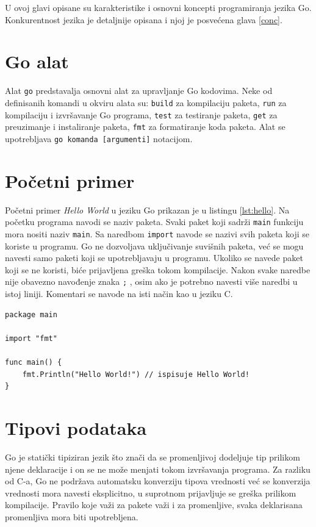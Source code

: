 \documentclass[12pt,oneside]{memoir}
\begin{document}
U ovoj glavi opisane su karakteristike i osnovni koncepti programiranja jezika Go.  Konkurentnost jezika je detaljnije opisana i njoj je posvećena glava \ref{conc}.

\section{Go alat}

Alat \texttt{go} predstavalja osnovni alat za upravljanje Go kodovima. Neke od definisanih komandi u okviru alata su: \texttt{build} za kompilaciju paketa, \texttt{run} za kompilaciju i izvršavanje Go programa, \texttt{test} za testiranje paketa, \texttt{get} za preuzimanje i instaliranje paketa, \texttt{fmt} za formatiranje koda paketa. Alat se upotrebljava \texttt{go komanda [argumenti]} notacijom.

\section{Početni primer}

Početni primer \textit{Hello World} u jeziku Go prikazan je u listingu \ref{lst:hello}. Na početku programa navodi se naziv paketa. Svaki paket koji sadrži \texttt{main} funkciju mora nositi naziv \texttt{main}. Sa naredbom \texttt{import} navode se nazivi svih paketa koji se koriste u programu. Go ne dozvoljava uključivanje suvišnih paketa, već se mogu navesti samo paketi koji se upotrebljavaju u programu. Ukoliko se navede paket koji se ne koristi, biće prijavljena greška tokom kompilacije. Nakon svake naredbe nije obavezno navođenje znaka \texttt{;} , osim ako je potrebno navesti više naredbi u istoj liniji. Komentari se navode na isti način kao u jeziku C.

\begin{center}
\begin{lstlisting}[caption=Program \textit{Hello World} u jeziku Go,label={lst:hello},  backgroundcolor=\color{background}]
package main

import "fmt"

func main() {
	fmt.Println("Hello World!") // ispisuje Hello World!
}
\end{lstlisting}
\end{center}

\section{Tipovi podataka}

Go je statički tipiziran jezik što znači da se promenljivoj dodeljuje tip prilikom njene deklaracije i on se ne može menjati tokom izvršavanja programa. Za razliku od C-a, Go ne podržava automatsku konverziju tipova vrednosti već se konverzija vrednosti mora navesti eksplicitno, u suprotnom prijavljuje se greška prilikom kompilacije. Pravilo koje važi za pakete važi i za promenljive, svaka deklarisana promenljiva mora biti upotrebljena.
\end{document}
